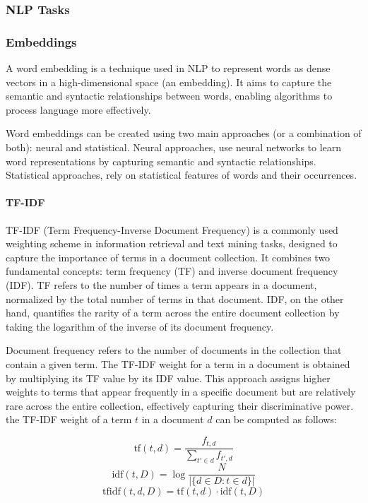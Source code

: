 \documentclass[a4paper,12pt]{article}
\begin{document}
\subsubsection{NLP Tasks}


\subsubsection{Embeddings}
A word embedding is a technique used in NLP to represent words as dense vectors in a high-dimensional space (an embedding). It aims to capture the semantic and syntactic relationships between words, enabling algorithms to process language more effectively.

Word embeddings can be created using two main approaches (or a combination of both): neural and statistical. 
Neural approaches, use neural networks to learn word representations by capturing semantic and syntactic relationships. Statistical approaches, rely on statistical features of words and their occurrences.

\paragraph{TF-IDF}
TF-IDF (Term Frequency-Inverse Document Frequency) is a commonly used weighting scheme in information retrieval and text mining tasks, designed to capture the importance of terms in a document collection. It combines two fundamental concepts: term frequency (TF) and inverse document frequency (IDF). TF refers to the number of times a term appears in a document, normalized by the total number of terms in that document. IDF, on the other hand, quantifies the rarity of a term across the entire document collection by taking the logarithm of the inverse of its document frequency. 

Document frequency refers to the number of documents in the collection that contain a given term. The TF-IDF weight for a term in a document is obtained by multiplying its TF value by its IDF value. This approach assigns higher weights to terms that appear frequently in a specific document but are relatively rare across the entire collection, effectively capturing their discriminative power. the TF-IDF weight of a term $t$ in a document $d$ can be computed as follows:

$${\displaystyle \mathrm {tf} (t,d)={\frac {f_{t,d}}{\sum _{t'\in d}{f_{t',d}}}}}$$
$$ \mathrm{idf}(t, D) =  \log \frac{N}{|\{d \in D: t \in d\}|}$$
$${\displaystyle \mathrm {tfidf} (t,d,D)=\mathrm {tf} (t,d)\cdot \mathrm {idf} (t,D)}$$
\end{document}
